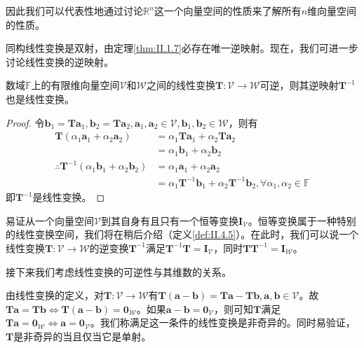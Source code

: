 \documentclass[main.tex]{subfiles}
\begin{document}
因此我们可以代表性地通过讨论$\mathbb{R}^n$这一个向量空间的性质来了解所有$n$维向量空间的性质。

同构线性变换是双射，由定理\ref{thm:II.1.7}必存在唯一逆映射。现在，我们可进一步讨论线性变换的逆映射。

\begin{theorem}
数域$\mathbb{F}$上的有限维向量空间$\mathcal{V}$和$\mathcal{W}$之间的线性变换$\mathbf{T}:\mathcal{V}\rightarrow\mathcal{W}$可逆，则其逆映射$\mathbf{T}^{-1}$也是线性变换。
\end{theorem}
\begin{proof}
令$\mathbf{b}_1=\mathbf{Ta}_1,\mathbf{b}_2=\mathbf{Ta}_2,\mathbf{a}_1,\mathbf{a}_2\in\mathcal{V},\mathbf{b}_1,\mathbf{b}_2\in\mathcal{W}$，则有
\begin{align*}
    \mathbf{T}\left(\alpha_1\mathbf{a}_1+\alpha_2\mathbf{a}_2\right)&=\alpha_1\mathbf{Ta}_1+\alpha_2\mathbf{Ta}_2\\
    &=\alpha_1\mathbf{b}_1+\alpha_2\mathbf{b}_2\\
    \therefore\mathbf{T}^{-1}\left(\alpha_1\mathbf{b}_1+\alpha_2\mathbf{b}_2\right)&=\alpha_1\mathbf{a}_1+\alpha_2\mathbf{a}_2\\
    &=\alpha_1\mathbf{T}^{-1}\mathbf{b}_1+\alpha_2\mathbf{T}^{-1}\mathbf{b}_2,\forall\alpha_1,\alpha_2\in\mathbb{F}
\end{align*}
即$\mathbf{T}^{-1}$是线性变换。
\end{proof}

易证从一个向量空间$\mathcal{V}$到其自身有且只有一个恒等变换$\mathbf{I}_\mathcal{V}$。恒等变换属于一种特别的线性变换空间，我们将在稍后介绍（定义\ref{def:II.4.5}）。在此时，我们可以说一个线性变换$\mathbf{T}:\mathcal{V}\rightarrow\mathcal{W}$的逆变换$\mathbf{T}^{-1}$满足$\mathbf{T}^{-1}\mathbf{T}=\mathbf{I}_\mathcal{V}$，同时$\mathbf{TT}^{-1}=\mathbf{I}_\mathcal{W}$。

接下来我们考虑线性变换的可逆性与其维数的关系。

由线性变换的定义，对$\mathbf{T}:\mathcal{V}\rightarrow\mathcal{W}$有$\mathbf{T}\left(\mathbf{a}-\mathbf{b}\right)=\mathbf{Ta}-\mathbf{Tb},\mathbf{a},\mathbf{b}\in\mathcal{V}$。故$\mathbf{Ta}=\mathbf{Tb}\Leftrightarrow\mathbf{T}\left(\mathbf{a}-\mathbf{b}\right)=\mathbf{0}_\mathcal{W}$。如果$\mathbf{a}-\mathbf{b}=\mathbf{0}_\mathcal{V}$，则可知$\mathbf{T}$满足$\mathbf{Ta}=\mathbf{0}_\mathcal{W}\Leftrightarrow\mathbf{a}=\mathbf{0}_\mathcal{V}$。我们称满足这一条件的线性变换是非奇异的。同时易验证，$\mathbf{T}$是非奇异的当且仅当它是单射。
\end{document}
